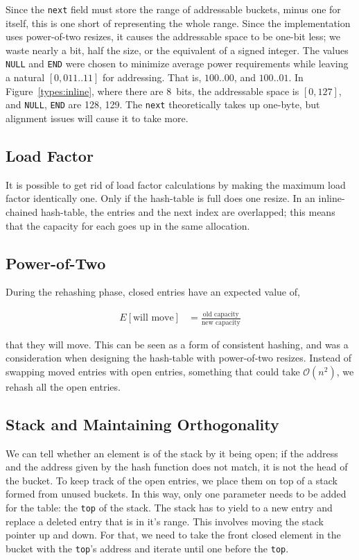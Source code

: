 \documentclass[12pt]{article}
\newcommand{\code}[1]{\colorbox{light-gray}{\texttt{#1}}}
\begin{document}
Since the \code{next} field must store the range of addressable buckets, minus one for itself, this is one short of representing the whole range. Since the implementation uses power-of-two resizes, it causes the addressable space to be one-bit less; we waste nearly a bit, half the size, or the equivalent of a signed integer. The values \code{NULL} and \code{END} were chosen to minimize average power requirements while leaving a natural $[0, 011..11]$ for addressing. That is, $100..00$, and $100..01$. In Figure~\ref{types:inline}, where there are 8~bits, the addressable space is $[0, 127]$, and \code{NULL}, \code{END} are 128, 129. The \code{next} theoretically takes up one-byte, but alignment issues will cause it to take more.

\subsection{Load Factor}

It is possible to get rid of load factor calculations by making the maximum load factor identically one. Only if the hash-table is full does one resize. In an inline-chained hash-table, the entries and the next index are overlapped; this means that the capacity for each goes up in the same allocation.

\subsection{Power-of-Two}

During the rehashing phase, closed entries have an expected value of,

\begin{align*}
E[\text{will move}] &= \frac{\text{old capacity}}{\text{new capacity}}
\end{align*}

that they will move. This can be seen as a form of consistent hashing\cite{karger1997consistent}, and was a consideration when designing the hash-table with power-of-two resizes. Instead of swapping moved entries with open entries, something that could take $\mathcal{O}(n^2)$, we rehash all the open entries.

\subsection{Stack and Maintaining Orthogonality}

We can tell whether an element is of the stack by it being open; if the address and the address given by the hash function does not match, it is not the head of the bucket. To keep track of the open entries, we place them on top of a stack formed from unused buckets. In this way, only one parameter needs to be added for the table: the \code{top} of the stack. The stack has to yield to a new entry and replace a deleted entry that is in it's range. This involves moving the stack pointer up and down. For that, we need to take the front closed element in the bucket with the \code{top}'s address and iterate until one before the \code{top}.
\end{document}
